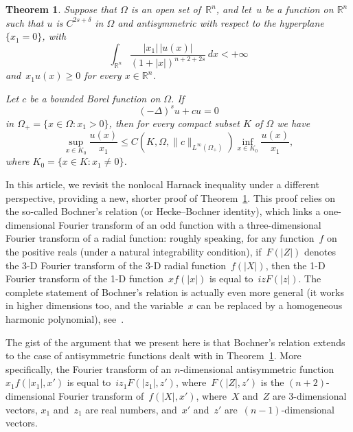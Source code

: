 \documentclass[a4paper,12pt,reqno]{amsart}
\numberwithin{equation}{section}
\newtheorem{theorem}{Theorem}[section]
\theoremstyle{definition}
\theoremstyle{notation}
\newcommand{\R}{\mathds{R}}
\renewcommand{\le}{\leqslant}
\renewcommand{\ge}{\geqslant}
\begin{document}
\begin{theorem}
\label{thm:odd:harnack}
Suppose that $\Omega$ is an open set of~$\R^n$,
and let~$u$ be a function on $\R^n$ such that $u$ is $C^{2s + \delta}$ in $\Omega$ and antisymmetric with respect to the hyperplane~$\{x_1=0\}$,
with
\begin{equation*}
\int_{\R^n}\frac{|x_1|\,|  u(x)|}{(1 + |x|)^{n + 2 +2s}}\, dx<+\infty
\end{equation*}
and~$x_1 u(x) \ge 0$ for every $x \in \R^n$.


Let $c$ be a bounded Borel function on $\Omega$. If
\[
 (-\Delta)^s u + c u = 0
\]
in $\Omega_+ = \{x \in \Omega : x_1 > 0\}$, then for every compact subset $K$ of $\Omega$ we have
\begin{equation}
\label{eq:odd:harnack}
 \sup_{x \in K_0} \frac{u(x)}{x_1} \le C(K, \Omega, \|c\|_{L^\infty(\Omega_+)}) \inf_{x \in K_0} \frac{u(x)}{x_1} ,
\end{equation}
where $K_0 = \{x \in K : x_1 \ne 0\}$.
\end{theorem}


In this article, we revisit the nonlocal Harnack inequality under a different perspective,
providing a new, shorter proof of Theorem~\ref{thm:odd:harnack}. This proof relies
on the so-called Bochner's relation (or Hecke--Bochner identity), which links a one-dimensional Fourier transform of an odd function with a three-dimensional Fourier transform of a radial function: roughly speaking, for any function~$ f$ on the positive reals (under a natural integrability condition), if~$F(|Z|)$ denotes the \mbox{3-D} Fourier transform of the 3-D radial function~$f(|X|)$, then the 1-D Fourier transform of the \mbox{1-D} function~$x f(|x|)$ is equal to~$i z F(|z|)$. The complete statement of Bochner's relation is actually even more general (it works in higher dimensions too, and the variable~$x$ can be replaced by a homogeneous harmonic polynomial), see~\cite[page~72]{stein}.


The gist of the argument that we present here is that
Bochner's relation extends to the case of antisymmetric functions dealt with in
Theorem~\ref{thm:odd:harnack}. More specifically,
the Fourier transform of an \(n\)-dimensional antisymmetric function~$ x_1 f(|x_1|, x')$ is equal to~$i z_1 F(|z_1|, z')$, where~$F (|Z|, z')$ is the $(n + 2)$-dimensional Fourier transform of~$f(|X|, x')$, where~$X$ and~$ Z$ are 3-dimensional vectors, $x_1$ and~$z_1$ are real numbers, and~$x'$ and~$z'$ are~$(n - 1)$-dimensional vectors.
\end{document}
